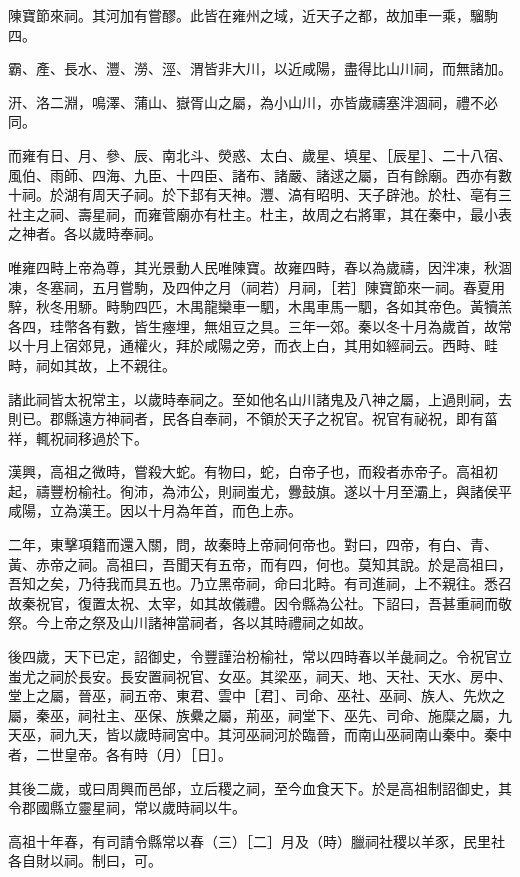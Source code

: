 陳寶節來祠。其河加有嘗醪。此皆在雍州之域，近天子之都，故加車一乘，騮駒四。

霸、產、長水、灃、澇、涇、渭皆非大川，以近咸陽，盡得比山川祠，而無諸加。

汧、洛二淵，鳴澤、蒲山、嶽胥山之屬，為小山川，亦皆歲禱塞泮涸祠，禮不必同。

而雍有日、月、參、辰、南北斗、熒惑、太白、歲星、填星、［辰星］、二十八宿、風伯、雨師、四海、九臣、十四臣、諸布、諸嚴、諸逑之屬，百有餘廟。西亦有數十祠。於湖有周天子祠。於下邽有天神。灃、滈有昭明、天子辟池。於杜、亳有三社主之祠、壽星祠，而雍菅廟亦有杜主。杜主，故周之右將軍，其在秦中，最小表之神者。各以歲時奉祠。

唯雍四畤上帝為尊，其光景動人民唯陳寶。故雍四畤，春以為歲禱，因泮凍，秋涸凍，冬塞祠，五月嘗駒，及四仲之月（祠若）月祠，［若］陳寶節來一祠。春夏用騂，秋冬用駵。畤駒四匹，木禺龍欒車一駟，木禺車馬一駟，各如其帝色。黃犢羔各四，珪幣各有數，皆生瘞埋，無俎豆之具。三年一郊。秦以冬十月為歲首，故常以十月上宿郊見，通權火，拜於咸陽之旁，而衣上白，其用如經祠云。西畤、畦畤，祠如其故，上不親往。

諸此祠皆太祝常主，以歲時奉祠之。至如他名山川諸鬼及八神之屬，上過則祠，去則已。郡縣遠方神祠者，民各自奉祠，不領於天子之祝官。祝官有祕祝，即有菑祥，輒祝祠移過於下。

漢興，高祖之微時，嘗殺大蛇。有物曰，蛇，白帝子也，而殺者赤帝子。高祖初起，禱豐枌榆社。徇沛，為沛公，則祠蚩尤，釁鼓旗。遂以十月至灞上，與諸侯平咸陽，立為漢王。因以十月為年首，而色上赤。

二年，東擊項籍而還入關，問，故秦時上帝祠何帝也。對曰，四帝，有白、青、黃、赤帝之祠。高祖曰，吾聞天有五帝，而有四，何也。莫知其說。於是高祖曰，吾知之矣，乃待我而具五也。乃立黑帝祠，命曰北畤。有司進祠，上不親往。悉召故秦祝官，復置太祝、太宰，如其故儀禮。因令縣為公社。下詔曰，吾甚重祠而敬祭。今上帝之祭及山川諸神當祠者，各以其時禮祠之如故。

後四歲，天下已定，詔御史，令豐謹治枌榆社，常以四時春以羊彘祠之。令祝官立蚩尤之祠於長安。長安置祠祝官、女巫。其梁巫，祠天、地、天社、天水、房中、堂上之屬，晉巫，祠五帝、東君、雲中［君］、司命、巫社、巫祠、族人、先炊之屬，秦巫，祠社主、巫保、族纍之屬，荊巫，祠堂下、巫先、司命、施糜之屬，九天巫，祠九天，皆以歲時祠宮中。其河巫祠河於臨晉，而南山巫祠南山秦中。秦中者，二世皇帝。各有時（月）［日］。

其後二歲，或曰周興而邑邰，立后稷之祠，至今血食天下。於是高祖制詔御史，其令郡國縣立靈星祠，常以歲時祠以牛。

高祖十年春，有司請令縣常以春（三）［二］月及（時）臘祠社稷以羊豕，民里社各自財以祠。制曰，可。


